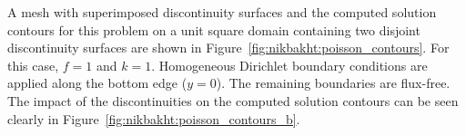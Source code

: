 A mesh with superimposed discontinuity surfaces and the computed
solution contours for this problem on a unit square domain
containing two disjoint discontinuity surfaces are shown in
Figure~\ref{fig:nikbakht:poisson_contours}.  For this case, $f = 1$
and $k = 1$.  Homogeneous Dirichlet boundary conditions are applied
along the bottom edge ($y = 0$). The remaining boundaries are flux-free.
The impact of the discontinuities on the computed solution contours can
be seen clearly in Figure~\ref{fig:nikbakht:poisson_contours_b}.
%
\begin{figure}
\end{figure}
